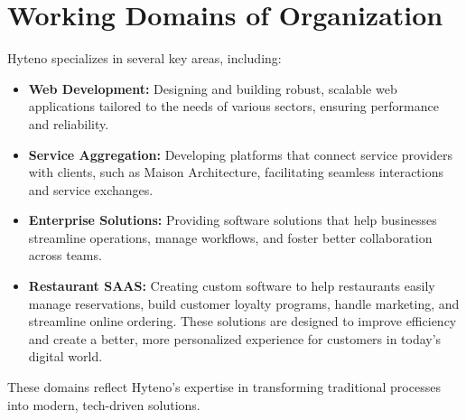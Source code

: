 \section{Working Domains of Organization}
Hyteno specializes in several key areas, including:
\begin{itemize}
  \item \textbf{Web Development:} Designing and building robust, scalable web applications tailored to the needs of various sectors, ensuring performance and reliability.
  \item \textbf{Service Aggregation:} Developing platforms that connect service providers with clients, such as Maison Architecture, facilitating seamless interactions and service exchanges.
  \item \textbf{Enterprise Solutions:} Providing software solutions that help businesses streamline operations, manage workflows, and foster better collaboration across teams.
  \item \textbf{Restaurant SAAS:} Creating custom software to help restaurants easily manage reservations, build customer loyalty programs, handle marketing, and streamline online ordering. These solutions are designed to improve efficiency and create a better, more personalized experience for customers in today’s digital world.
\end{itemize}
These domains reflect Hyteno's expertise in transforming traditional processes into modern, tech-driven solutions.
